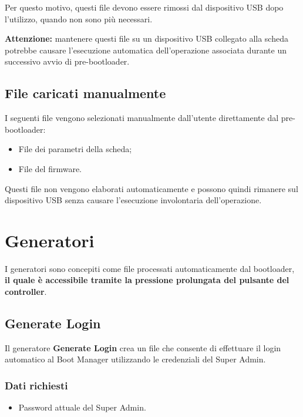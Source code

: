 \documentclass[11pt,a4paper]{article}
\newcommand{\button}[1]{\textbf{#1}}
\begin{document}
Per questo motivo, questi file devono essere rimossi dal dispositivo
USB dopo l'utilizzo, quando non sono più necessari.

\textbf{Attenzione:} mantenere questi file su un dispositivo USB
collegato alla scheda potrebbe causare l'esecuzione automatica
dell'operazione associata durante un successivo avvio di pre-bootloader.

\subsection{File caricati manualmente}

I seguenti file vengono selezionati manualmente dall'utente
direttamente dal pre-bootloader:

\begin{itemize}
    \item File dei parametri della scheda;
    \item File del firmware.
\end{itemize}

Questi file non vengono elaborati automaticamente e possono quindi
rimanere sul dispositivo USB senza causare l'esecuzione involontaria
dell'operazione.

\section{Generatori}

I generatori sono concepiti come file processati automaticamente dal bootloader,
\textbf{il quale è accessibile tramite la pressione prolungata del pulsante del controller}.


\subsection{Generate Login}

Il generatore \button{Generate Login} crea un file che consente
di effettuare il login automatico al Boot Manager utilizzando
le credenziali del Super Admin. 

\subsubsection*{Dati richiesti}

\begin{itemize}
    \item Password attuale del Super Admin.
\end{itemize}
\end{document}
